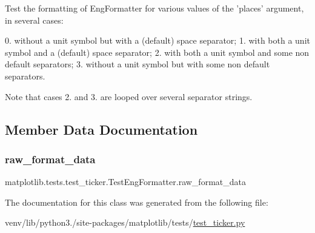\begin{DoxyVerb}Test the formatting of EngFormatter for various values of the 'places'
argument, in several cases:

0. without a unit symbol but with a (default) space separator;
1. with both a unit symbol and a (default) space separator;
2. with both a unit symbol and some non default separators;
3. without a unit symbol but with some non default separators.

Note that cases 2. and 3. are looped over several separator strings.
\end{DoxyVerb}
 

\subsection{Member Data Documentation}
\mbox{\label{classmatplotlib_1_1tests_1_1test__ticker_1_1TestEngFormatter_ad6892bd4a75353f9e554e57125a30c67}} 
\subsubsection{\texorpdfstring{raw\+\_\+format\+\_\+data}{raw\_format\_data}}
{\footnotesize\ttfamily matplotlib.\+tests.\+test\+\_\+ticker.\+Test\+Eng\+Formatter.\+raw\+\_\+format\+\_\+data\hspace{0.3cm}{\ttfamily [static]}}



The documentation for this class was generated from the following file\+:\begin{DoxyCompactItemize}
\item 
venv/lib/python3./site-\/packages/matplotlib/tests/\hyperlink{test__ticker_8py}{test\+\_\+ticker.\+py}\end{DoxyCompactItemize}
